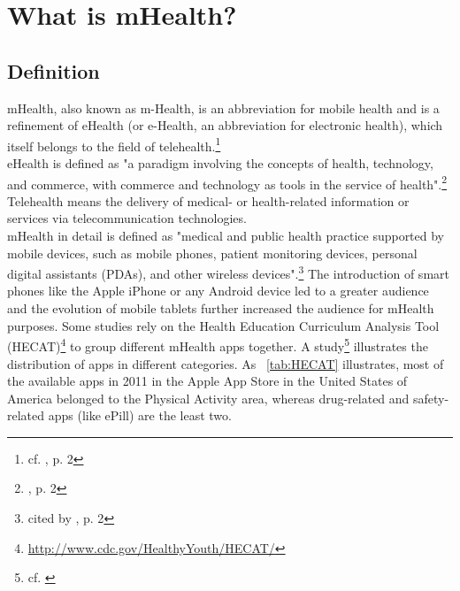 \section{What is mHealth?}

\subsection{Definition}
mHealth, also known as m-Health, is an abbreviation for mobile health and is a refinement of eHealth (or e-Health, an abbreviation for electronic health), which itself belongs to the field of telehealth.\footnote{cf. \cite{MartinezPerez.2013}, p. 2}
\\
eHealth is defined as "a paradigm involving the concepts of health, technology, and commerce, with commerce and technology as tools in the service of health".\footnote{\cite{MartinezPerez.2013}, p. 2}
\\
Telehealth means the delivery of medical- or health-related information or services via telecommunication technologies.
\\
mHealth in detail is defined as "medical and public health practice supported by mobile devices, such as mobile phones, patient monitoring devices, personal digital assistants (PDAs), and other wireless devices".\footnote{\cite{WorldHealthOrganization.2011} cited by \cite{MartinezPerez.2013}, p. 2} The introduction of smart phones like the Apple iPhone or any Android device led to a greater audience and the evolution of mobile tablets further increased the audience for mHealth purposes. Some studies rely on the Health Education Curriculum Analysis Tool (HECAT)\footnote{\url{http://www.cdc.gov/HealthyYouth/HECAT/}} to group different mHealth apps together. A study\footnote{cf. \cite{West.2012}} illustrates the distribution of apps in different categories. As ~\ref{tab:HECAT} illustrates, most of the available apps in 2011 in the Apple App Store in the United States of America belonged to the Physical Activity area, whereas drug-related and safety-related apps (like ePill) are the least two. 

